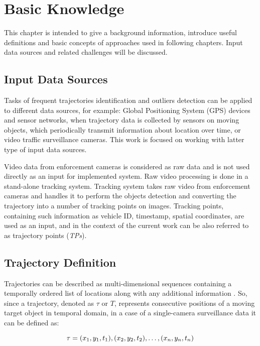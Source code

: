 \chapter{Basic Knowledge}
\label{ch:Basic Knowledge}

This chapter is intended to give a background information, introduce useful definitions and basic concepts of approaches used in following chapters. Input data sources and related challenges will be discussed.

\section{Input Data Sources}

Tasks of frequent trajectories identification and outliers detection can be applied to different data sources, for example: Global Positioning System (GPS) devices and sensor networks, when trajectory data is collected by sensors on moving objects, which periodically transmit information about location over time, or video traffic surveillance cameras. This work is focused on working with latter type of input data sources.

Video data from enforcement cameras is considered as raw data and is not used directly as an input for implemented system. Raw video processing is done in a stand-alone tracking system. Tracking system takes raw video from enforcement cameras and handles it to perform the objects detection and converting the trajectory into a number of tracking points on images. Tracking points, containing such information as vehicle ID, timestamp, spatial coordinates, are used as an input, and in the context of the current work can be also referred to as trajectory points (\textit{TPs}).

\section{Trajectory Definition}

Trajectories can be described as multi-dimensional sequences containing a temporally ordered list of locations along with any additional information \cite{article:1_survey_stdm}. So, since a trajectory, denoted as $\tau$ or $T$, represents consecutive positions of a moving target object in temporal domain, in a case of a single-camera surveillance data it can be defined as:

\begin{equation}
	\tau = {(x_1, y_1, t_1), (x_2, y_2, t_2), \ldots, (x_n, y_n, t_n)}\\[3pt]
\end{equation}

